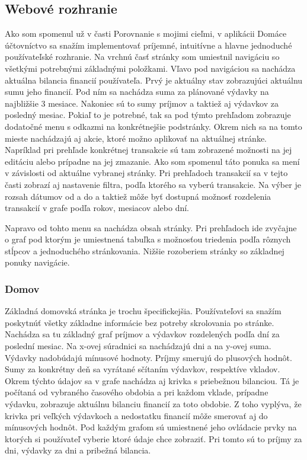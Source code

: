 \documentclass[12pt,oneside]{book}
\begin{document}
\subsection{Webové rozhranie}
Ako som spomenul už v časti Porovnanie s mojimi cieľmi, v aplikácii Domáce účtovníctvo sa snažím implementovať príjemné, intuitívne a hlavne jednoduché používateľské rozhranie. Na vrchnú časť stránky som umiestnil navigáciu so všetkými potrebnými základnými položkami. Vľavo pod navigáciou sa nachádza aktuálna bilancia financií používateľa. Prvý je aktuálny stav zobrazujúci aktuálnu sumu jeho financií. Pod ním sa nachádza suma za plánované výdavky na najbližšie 3 mesiace. Nakoniec sú to sumy príjmov a taktiež aj výdavkov za posledný mesiac. Pokiaľ to je potrebné, tak sa pod týmto prehľadom zobrazuje dodatočné menu s odkazmi na konkrétnejšie podstránky. Okrem nich sa na tomto mieste nachádzajú aj akcie, ktoré možno aplikovať na aktuálnej stránke. Napríklad pri prehľade konkrétnej transakcie sú tam zobrazené možnosti na jej editáciu alebo prípadne na jej zmazanie. Ako som spomenul táto ponuka sa mení v závislosti od aktuálne vybranej stránky. Pri prehľadoch transakcií sa v tejto časti zobrazí aj nastavenie filtra, podľa ktorého sa vyberú transakcie. Na výber je rozsah dátumov od a do a taktiež môže byť dostupná možnosť rozdelenia transakcií v grafe podľa rokov, mesiacov alebo dní.

Napravo od tohto menu sa nachádza obsah stránky. Pri prehľadoch ide zvyčajne o graf pod ktorým je umiestnená tabuľka s možnosťou triedenia podľa rôznych stĺpcov a jednoduchého stránkovania. Nižšie rozoberiem stránky so základnej ponuky navigácie. 

\subsubsection{Domov}
Základná domovská stránka je trochu špecifickejšia. Používateľovi sa snažím poskytnúť všetky základne informácie bez potreby skrolovania po stránke. Nachádza sa tu základný graf príjmov a výdavkov rozdelených podľa dní za poslední mesiac. Na x-ovej súradnici sa nachádzajú dni a na y-ovej suma. Výdavky nadobúdajú mínusové hodnoty. Príjmy smerujú do plusových hodnôt. Sumy za konkrétny deň sa vyrátané sčítaním výdavkov, respektíve vkladov. Okrem týchto údajov sa v grafe nachádza aj krivka s priebežnou bilanciou. Tá je počítaná od vybraného časového obdobia a pri každom vklade, prípadne výdavku, zobrazuje aktuálnu bilanciu financií za toto obdobie. Z toho vyplýva, že krivka pri veľkých výdavkoch a nedostatku financií môže smerovať aj do mínusových hodnôt. Pod každým grafom sú umiestnené jeho ovládacie prvky na ktorých si používateľ vyberie ktoré údaje chce zobraziť. Pri tomto sú to príjmy za dni, výdavky za dni a pribežná bilancia.
\end{document}

